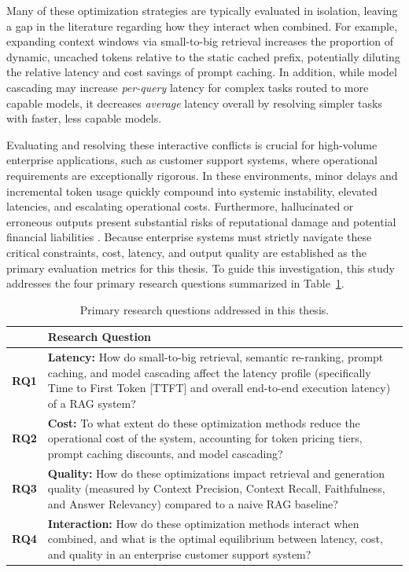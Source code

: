 Many of these optimization strategies are typically evaluated in isolation, leaving a gap in the literature regarding how they interact when combined. For example, expanding context windows via small-to-big retrieval increases the proportion of dynamic, uncached tokens relative to the static cached prefix, potentially diluting the relative latency and cost savings of prompt caching. In addition, while model cascading may increase \textit{per-query} latency for complex tasks routed to more capable models, it decreases \textit{average} latency overall by resolving simpler tasks with faster, less capable models.

Evaluating and resolving these interactive conflicts is crucial for high-volume enterprise applications, such as customer support systems, where operational requirements are exceptionally rigorous. In these environments, minor delays and incremental token usage quickly compound into systemic instability, elevated latencies, and escalating operational costs. Furthermore, hallucinated or erroneous outputs present substantial risks of reputational damage and potential financial liabilities \citep{aba2024aircanada}. Because enterprise systems must strictly navigate these critical constraints, cost, latency, and output quality are established as the primary evaluation metrics for this thesis. To guide this investigation, this study addresses the four primary research questions summarized in Table~\ref{tab:research_questions}.

\begin{table}[htbp]
    \centering
    \caption[Primary research questions]{Primary research questions addressed in this thesis.}
    \label{tab:research_questions}
    \begin{tabularx}{\textwidth}{l X}
    \toprule
    \textbf{} & \textbf{Research Question} \\
    \midrule
    \textbf{RQ1} & \textbf{Latency:} How do small-to-big retrieval, semantic re-ranking, prompt caching, and model
  cascading affect the latency profile (specifically Time to First Token [TTFT] and overall end-to-end execution
  latency) of a RAG system? \\
    \addlinespace
    \textbf{RQ2} & \textbf{Cost:} To what extent do these optimization methods reduce the operational cost of the
  system, accounting for token pricing tiers, prompt caching discounts, and model cascading? \\
    \addlinespace
    \textbf{RQ3} & \textbf{Quality:} How do these optimizations impact retrieval and generation quality (measured by
  Context Precision, Context Recall, Faithfulness, and Answer Relevancy) compared to a naive RAG baseline? \\
    \addlinespace
    \textbf{RQ4} & \textbf{Interaction:} How do these optimization methods interact when combined, and what is the
  optimal equilibrium between latency, cost, and quality in an enterprise customer support system? \\
    \bottomrule
    \end{tabularx}
\end{table}

